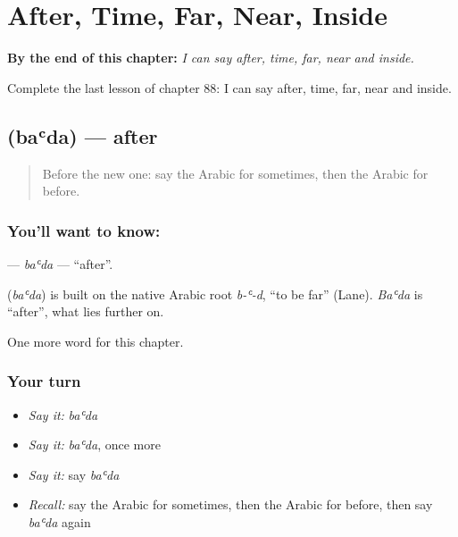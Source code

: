 
\chapter{After, Time, Far, Near, Inside}
\label{ch:ar-after-time-far-near-inside}

\begin{chapteropening}
\textbf{By the end of this chapter:} \emph{I can say after, time, far, near and inside.}

Complete the last lesson of chapter 88: I can say after, time, far, near and inside.
\end{chapteropening}

\section[\texorpdfstring{\ar{بعد} (baʿda)}{بعد (baʿda)}]{ (baʿda) — after}

\label{lesson:AR-C88-bada}



\begin{quote}
Before the new one: say the Arabic for sometimes, then the Arabic for before.
\end{quote}

\subsection*{You'll want to know: }
\textbf{} — \emph{baʿda} — \textquotedblleft{}after\textquotedblright{}.

\begin{cousinweb}
\textbf{} (\emph{baʿda}) is built on the native Arabic root \emph{b-ʿ-d}, \textquotedblleft{}to be far\textquotedblright{} (Lane). \emph{Baʿda} is \textquotedblleft{}after\textquotedblright{}, what lies further on.
\end{cousinweb}

\begin{grammarlens}[title={What you've built}]
One more word for this chapter.
\end{grammarlens}

\subsection*{Your turn}
\begin{itemize}
\raggedright
  \item \emph{Say it:} \emph{baʿda}
  \item \emph{Say it:} \emph{baʿda}, once more
  \item \emph{Say it:} say \emph{baʿda}
  \item \emph{Recall:} say the Arabic for sometimes, then the Arabic for before, then say \emph{baʿda} again
\end{itemize}


